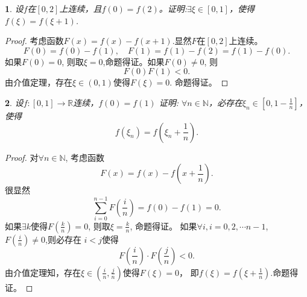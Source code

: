 \documentclass[utf8]{book}
\newtheorem{example}{}[section]             %
\begin{document}
\begin{example}
设$f$在$[0,2]$上连续，且$f(0)=f(2)$。证明:$\exists \xi \in[0,1]$，使得$f(\xi)=f(\xi+1)$.
\end{example}
\begin{proof}考虑函数$F(x) = f(x) - f(x+1)$.显然$F$在$[0,2]$上连续。
$$F(0) = f(0) - f(1), \quad F(1) = f(1) - f(2) = f(1) - f(0).$$
如果$F(0) = 0$, 则取$\xi = 0$,命题得证。如果$F(0)\neq 0$, 则
$$F(0)F(1) < 0.$$
由介值定理，存在$\xi\in(0,1)$使得$F(\xi) = 0$. 命题得证。
\end{proof}
\begin{example}
设$f:[0,1]\rightarrow \mathbb{R}$连续，$f(0)=f(1)$ 证明: $\forall n\in\mathbb{N}$，必存在$\xi_n\in[0, 1-\frac{1}{n}]$，使得$$f(\xi_n) = f\left(\xi_n+\frac{1}{n}\right).$$
\end{example}
\begin{proof}对$\forall n\in\mathbb{N}$, 考虑函数$$F(x) = f(x) -f\left(x+\frac{1}{
n}\right).$$
很显然
$$\displaystyle\sum_{i=0}^{n-1}F\left(\frac{i}{n}\right) = f(0)-f(1) = 0.$$
如果$\exists k$使得$F\left(\frac{k}{n}\right)=0$, 则取$\xi=\frac{k}{n}$, 命题得证。
如果$\forall i, i =0, 2,\cdots n-1$, $F\left(\frac{i}{n}\right)\neq 0$,则必存在
$i < j$使得$$F\left(\frac{i}{n}\right)\cdot F\left(\frac{j}{n}\right) < 0.$$
由介值定理知，存在$\xi\in(\frac{i}{n}, \frac{j}{n})$使得$F(\xi) = 0$， 即$f(\xi) = f\left(\xi+\frac{1}{n}\right)$.命题得证。
\end{proof}
\end{document}
